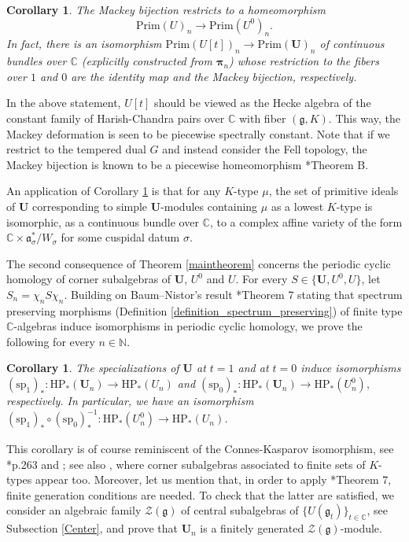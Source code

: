 \documentclass{amsart}
\newtheorem{corollaryintro}[theoremintro]{Corollary}
\theoremstyle{definition}
\begin{document}
\begin{corollaryintro}\label{intro_piecewise_homeo}
     The Mackey bijection restricts to a homeomorphism \[\mathrm{Prim}(U)_n \to \mathrm{Prim}(U^0)_n.\]
     In fact, there is an isomorphism $\mathrm{Prim}(U[t])_n \to \mathrm{Prim}(\bm{U})_n$ of continuous bundles over $\mathbb{C}$ (explicitly constructed from $\bm{\pi}_n$) whose restriction to the fibers over $1$ and $0$ are the identity map and the Mackey bijection, respectively.
\end{corollaryintro}

In the above statement, $U[t]$ should be viewed as the Hecke algebra of the constant family of Harish-Chandra pairs over $\mathbb{C}$ with fiber $(\mathfrak{g},K)$. This way, the Mackey deformation is seen to be piecewise spectrally constant. Note that if we restrict to the tempered dual $G$ and instead consider the Fell topology, the Mackey bijection is known to be a piecewise homeomorphism \cite{AfgoustidisClare}*{Theorem B}.

An application of Corollary \ref{intro_piecewise_homeo} is that for any $K$-type $\mu$, the set of primitive ideals of $\bm{U}$ corresponding to simple $\bm{U}$-modules containing $\mu$ as a lowest $K$-type is isomorphic, as a continuous bundle over $\mathbb{C}$, to a complex affine variety of the form $\mathbb{C}\times\mathfrak{a}_\sigma^*/W_\sigma$ for some cuspidal datum $\sigma$.

The second consequence of Theorem \ref{maintheorem} concerns the periodic cyclic homology of corner subalgebras of $\bm{U}$, $U^0$ and $U$. For every $S \in \{\bm{U}, U^0, U\}$, let $S_n = \chi_n S \chi_n$. Building on Baum--Nistor's result \cite{BaumNistor}*{Theorem 7} stating that spectrum preserving morphisms (Definition \ref{definition_spectrum_preserving}) of finite type $\mathbb{C}$-algebras induce isomorphisms in periodic cyclic homology, we prove the following for every $n \in \mathbb{N}$.

\begin{corollaryintro}
    The specializations of $\bm{U}$ at $t=1$ and at $t=0$ induce isomorphisms
    \((\mathrm{sp}_1)_* : \mathrm{HP}_*(\bm{U}_n) \to \mathrm{HP}_*(U_n)\) and \((\mathrm{sp}_0)_* : \mathrm{HP}_*(\bm{U}_n) \to \mathrm{HP}_*(U^0_n),\) respectively. In particular, we have an isomorphism $(\mathrm{sp}_1)_* \circ (\mathrm{sp}_0)_*^{-1} : \mathrm{HP}_*(U^0_n) \to \mathrm{HP}_*(U_n)$.
\end{corollaryintro}

This corollary is of course reminiscent of the Connes-Kasparov isomorphism, see \cite{BaumConnesHigson}*{p.263} and \cites{MAhigson, Afgoustidis3}; see also \cite{Bradd}, where corner subalgebras associated to finite sets of $K$-types appear too. Moreover, let us mention that, in order to apply \cite{BaumNistor}*{Theorem 7}, finite generation conditions are needed. To check that the latter are satisfied, we consider an algebraic family $\mathcal{Z}(\bm{\mathfrak{g}})$ of central subalgebras of $\{U(\mathfrak{g}_t)\}_{t \in \mathbb{C}}$, see Subsection \ref{Center}, and prove that $\bm{U}_n$ is a finitely generated $\mathcal{Z}(\bm{\mathfrak{g}})$-module.
\end{document}
